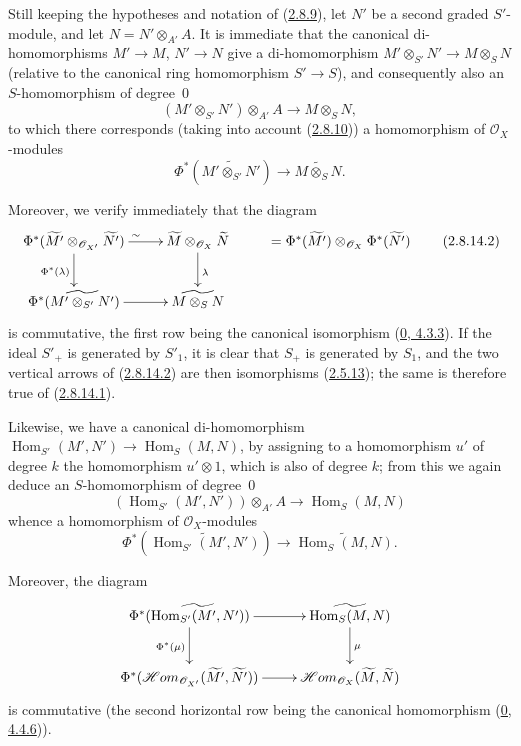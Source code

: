 
\begin{env}[2.8.14]
\label{II.2.8.14}
Still keeping the hypotheses and notation of
(\hyperref[II.2.8.9]{2.8.9}), let $N'$ be a second graded $S'$-module, and
let $N=N'\otimes_{A'}A$. It is immediate that the canonical di-homomorphisms
$M'\to M$, $N'\to N$ give a di-homomorphism
$M'\otimes_{S'}N'\to M\otimes_S N$ (relative to the canonical ring
homomorphism $S'\to S$), and consequently also an $S$-homomorphism of
degree~$0$
\[
  (M'\otimes_{S'}N')\otimes_{A'}A\longrightarrow M\otimes_S N,
\]
to which there corresponds (taking into account
(\hyperref[II.2.8.10]{2.8.10})) a homomorphism of
$\mathcal{O}_X$-modules
\[
\label{II.2.8.14.1}
  \Phi^*(\widetilde{M'\otimes_{S'}N'})
  \longrightarrow\widetilde{M\otimes_S N}.
\tag{2.8.14.1}
\]

Moreover, we verify immediately that the diagram
\[
\label{II.2.8.14.2}
  \xymatrix{
    \Phi^*(\widetilde{M'}\otimes_{\mathcal{O}_{X'}}\widetilde{N'})
      \ar[r]^{\sim}\ar[d]_{\Phi^*(\lambda)}
    & \widetilde{M}\otimes_{\mathcal{O}_X}\widetilde{N}
      \ar[d]^{\lambda}
    & =\Phi^*(\widetilde{M'})\otimes_{\mathcal{O}_X}
      \Phi^*(\widetilde{N'})\\
    \Phi^*(\widetilde{M'\otimes_{S'}N'})\ar[r]
    & \widetilde{M\otimes_S N}
  }
\tag{2.8.14.2}
\]
is commutative, the first row being the canonical isomorphism
(\hyperref[0.4.3.3]{0, 4.3.3}). If the ideal $S'_+$ is generated by
$S'_1$, it is clear that $S_+$ is generated by $S_1$, and the two vertical
arrows of (\hyperref[II.2.8.14.2]{2.8.14.2}) are then isomorphisms
(\hyperref[II.2.5.13]{2.5.13}); the same is therefore true of
(\hyperref[II.2.8.14.1]{2.8.14.1}).

Likewise, we have a canonical di-homomorphism
$\operatorname{Hom}_{S'}(M',N')\to\operatorname{Hom}_S(M,N)$, by assigning to
a homomorphism $u'$ of degree $k$ the homomorphism $u'\otimes1$, which is
also of degree $k$; from this we again deduce an $S$-homomorphism of
degree~$0$
\[
  (\operatorname{Hom}_{S'}(M',N'))\otimes_{A'}A
  \longrightarrow\operatorname{Hom}_S(M,N)
\]
whence a homomorphism of $\mathcal{O}_X$-modules
\[
\label{II.2.8.14.3}
  \Phi^*(\widetilde{\operatorname{Hom}_{S'}(M',N')})
  \longrightarrow\widetilde{\operatorname{Hom}_S(M,N)}.
\tag{2.8.14.3}
\]

Moreover, the diagram
\[
  \xymatrix{
    \Phi^*(\widetilde{\operatorname{Hom}_{S'}(M',N')})\ar[r]
      \ar[d]_{\Phi^*(\mu)}
    & \widetilde{\operatorname{Hom}_S(M,N)}\ar[d]^{\mu}\\
    \Phi^*(\mathcal{H}om_{\mathcal{O}_{X'}}
      (\widetilde{M'},\widetilde{N'}))\ar[r]
    & \mathcal{H}om_{\mathcal{O}_X}(\widetilde{M},\widetilde{N})
  }
\]
is commutative (the second horizontal row being the canonical homomorphism
(\hyperref[0.4.4.6]{0, 4.4.6})).
\end{env}

